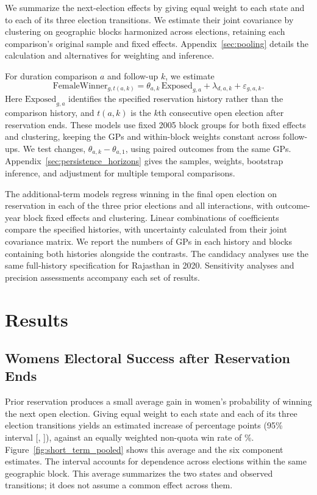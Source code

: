 \documentclass[11pt]{article}
\begin{document}
We summarize the next-election effects by giving equal weight to each state and to each of its three election transitions. We estimate their joint covariance by clustering on geographic blocks harmonized across elections, retaining each comparison's original sample and fixed effects. Appendix~\ref{sec:pooling} details the calculation and alternatives for weighting and inference.

For duration comparison $a$ and follow-up $k$, we estimate
\begin{equation}\label{eq:duration}
\text{FemaleWinner}_{g,t(a,k)} = \theta_{a,k}\,\text{Exposed}_{g,a}
+ \lambda_{d,a,k} + \varepsilon_{g,a,k}.
\end{equation}
\noindent Here $\text{Exposed}_{g,a}$ identifies the specified reservation history rather than the comparison history, and $t(a,k)$ is the $k$th consecutive open election after reservation ends. These models use fixed 2005 block groups for both fixed effects and clustering, keeping the GPs and within-block weights constant across follow-ups. We test changes, $\theta_{a,k}-\theta_{a,1}$, using paired outcomes from the same GPs. Appendix~\ref{sec:persistence_horizons} gives the samples, weights, bootstrap inference, and adjustment for multiple temporal comparisons.

The additional-term models regress winning in the final open election on reservation in each of the three prior elections and all interactions, with outcome-year block fixed effects and clustering. Linear combinations of coefficients compare the specified histories, with uncertainty calculated from their joint covariance matrix. We report the numbers of GPs in each history and blocks containing both histories alongside the contrasts. The candidacy analyses use the same full-history specification for Rajasthan in 2020. Sensitivity analyses and precision assessments accompany each set of results.

\section{Results}\label{sec:results}

\subsection{Women\textquotesingle{}s Electoral Success after Reservation Ends}

Prior reservation produces a small average gain in women's probability of winning the next open election. Giving equal weight to each state and each of its three election transitions yields an estimated increase of \poolEstimate{} percentage points (95\% interval [\poolLow{}, \poolHigh{}]), against an equally weighted non-quota win rate of \poolControl{}\%. Figure~\ref{fig:short_term_pooled} shows this average and the six component estimates. The interval accounts for dependence across elections within the same geographic block. This average summarizes the two states and observed transitions; it does not assume a common effect across them.
\end{document}
